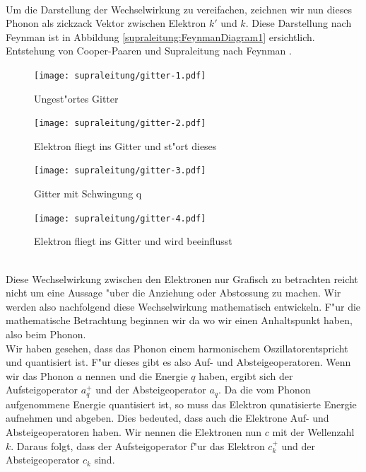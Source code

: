 \begin{refsection}
\\
Um die Darstellung der Wechselwirkung zu vereifachen, zeichnen wir nun dieses Phonon als zickzack Vektor zwischen Elektron $k'$ und $k$. Diese Darstellung nach Feynman ist in Abbildung \ref{supraleitung:FeynmanDiagram1} ersichtlich.
\\

Entstehung von Cooper-Paaren und Supraleitung nach Feynman
\cite{supraleitung:feynman}.
\begin{figure}
\centering
\texttt{[image: supraleitung/gitter-1.pdf]} %
\caption{Ungest"ortes Gitter
\label{supraleitung:Gitter1}}
\end{figure}
\begin{figure}
\centering
\texttt{[image: supraleitung/gitter-2.pdf]} %
\caption{Elektron fliegt ins Gitter und st"ort dieses
\label{supraleitung:Gitter2}}
\end{figure}
\begin{figure}
\centering
\texttt{[image: supraleitung/gitter-3.pdf]} %
\caption{Gitter mit Schwingung q
\label{supraleitung:Gitter3}}
\end{figure}
\begin{figure}
\centering
\texttt{[image: supraleitung/gitter-4.pdf]} %
\caption{Elektron fliegt ins Gitter und wird beeinflusst
\label{supraleitung:Gitter4}}
\end{figure}
\\
Diese Wechselwirkung zwischen den Elektronen nur Grafisch zu betrachten reicht nicht um eine Aussage "uber die Anziehung oder Abstossung zu machen. Wir werden also nachfolgend diese Wechselwirkung mathematisch entwickeln. F"ur die mathematische Betrachtung beginnen wir da wo wir einen Anhaltspunkt haben, also beim Phonon.
\\
Wir haben gesehen, dass das Phonon einem harmonischem Oszillatorentspricht und quantisiert ist. F"ur dieses gibt es also Auf- und Absteigeoperatoren. Wenn wir das Phonon $a$ nennen und die Energie $q$ haben, ergibt sich der Aufsteigoperator $a^+_q$ und der Absteigeoperator $a_q$. Da die vom Phonon aufgenommene Energie quantisiert ist, so muss das Elektron qunatisierte Energie aufnehmen und abgeben. Dies bedeuted, dass auch die Elektrone Auf- und Absteigeoperatoren haben. Wir nennen die Elektronen nun $c$ mit der Wellenzahl $k$. Daraus folgt, dass der Aufsteigoperator f"ur das Elektron $c^+_k$ und der Absteigeoperator $c_k$ sind.

\end{refsection}
